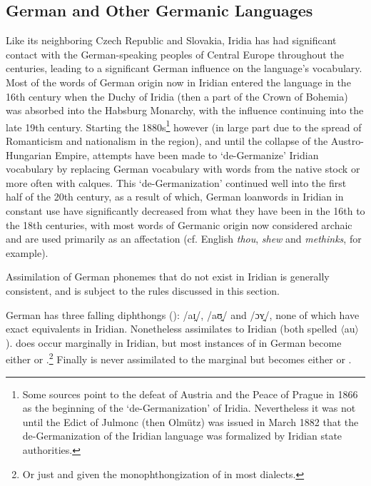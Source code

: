 \subsection{German and Other Germanic Languages}

Like its neighboring Czech Republic and Slovakia, Iridia has had significant contact with the German-speaking peoples of Central Europe throughout the centuries, leading to a significant German influence on the language's vocabulary. Most of the words of German origin now in Iridian entered the language in the 16th century when the Duchy of Iridia (then a part of the Crown of Bohemia) was absorbed into the Habsburg Monarchy, with the influence continuing into the late 19th century. Starting the 1880s\footnote{Some sources point to the defeat of Austria and the Peace of Prague in 1866 as the beginning of the `de-Germanization' of Iridia. Nevertheless it was not until the Edict of Julmonc (then Olm\"utz) was issued in March 1882 that the de-Germanization of the Iridian language was formalized by Iridian state authorities.} however (in large part due to the spread of Romanticism and nationalism in the region), and until the collapse of the Austro-Hungarian Empire, attempts have been made to `de-Germanize' Iridian vocabulary by replacing German vocabulary with words from the native stock or more often with calques. This `de-Germanization' continued well into the first half of the 20th century, as a result of which, German loanwords in Iridian in constant use have significantly decreased from what they have been in the 16th to the 18th centuries, with most words of Germanic origin now considered archaic and are used primarily as an affectation (cf. English \emph{thou}, \emph{shew} and \emph{methinks}, for example).

Assimilation of German phonemes that do not exist in Iridian is generally consistent, and is subject to the rules discussed in this section.

German has three falling diphthongs (\cite{wiese1996}): /aɪ̯/, /aʊ̯/ and /ɔʏ̯/, none of which have exact equivalents in Iridian. Nonetheless  assimilates to Iridian  (both spelled $\langle$au$\rangle$).  does occur marginally in Iridian, but most instances of  in German become either  or .\footnote{Or just  and  given the monophthongization of  in most dialects.} Finally  is never assimilated to the marginal  but becomes either  or .


